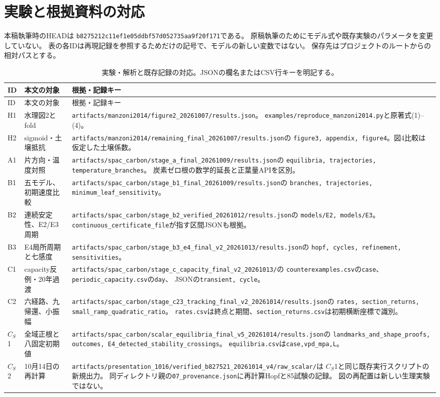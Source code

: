 \documentclass[a4paper,11pt]{ltjsarticle}
\newcommand{\code}[1]{\nolinkurl{#1}}
\begin{document}
\section{実験と根拠資料の対応}\label{app:evidence}
本稿執筆時のHEADは
\code{b8275212c11ef1e05ddbf57d052735aa9f20f171}である。
原稿執筆のためにモデル式や既存実験のパラメータを変更していない。
表の各IDは再現記録を参照するためだけの記号で、モデルの新しい変数ではない。
保存先はプロジェクトのルートからの相対パスとする。
\begin{longtable}{p{.09\linewidth}p{.22\linewidth}p{.60\linewidth}}
\caption{実験・解析と既存記録の対応。JSONの欄名またはCSV行キーを明記する。}\\
\toprule ID&本文の対象&根拠・記録キー\\\midrule\endfirsthead
\toprule ID&本文の対象&根拠・記録キー\\\midrule\endhead
H1&水理図2とfold&
\code{artifacts/manzoni2014/figure2_20261007/results.json}。
\code{examples/reproduce_manzoni2014.py}と原著式(1)--(4)。\\
H2&sigmoid・土壌抵抗&
\code{artifacts/manzoni2014/remaining_final_20261007/results.json}の
\code{figure3, appendix, figure4}。図4比較は仮定した土壌係数。\\
A1&片方向・温度対照&
\code{artifacts/spac_carbon/stage_a_final_20261009/results.json}の
\code{equilibria, trajectories, temperature_branches}。
炭素ゼロ根の数学的延長と正葉量APIを区別。\\
B1&五モデル、初期速度比較&
\code{artifacts/spac_carbon/stage_b1_final_20261009/results.json}の
\code{branches, trajectories, minimum_leaf_sensitivity}。\\
B2&連続安定性、E2/E3周期&
\code{artifacts/spac_carbon/stage_b2_verified_20261012/results.json}の
\code{models/E2, models/E3}。
\code{continuous_certificate_file}が指す区間JSONも根拠。\\
B3&E4局所周期と七感度&
\code{artifacts/spac_carbon/stage_b3_e4_final_v2_20261013/results.json}の
\code{hopf, cycles, refinement, sensitivities}。\\
C1&capacity反例・20年過渡&
\code{artifacts/spac_carbon/stage_c_capacity_final_v2_20261013/}の
\code{counterexamples.csv}の\code{case}、
\code{periodic_capacity.csv}の\code{day}、
JSONの\code{transient, cycle}。\\
C2&六経路、九帰還、小振幅&
\code{artifacts/spac_carbon/stage_c23_tracking_final_v2_20261014/results.json}の
\code{rates, section_returns, small_ramp_quadratic_ratio}。
\code{rates.csv}は終点と期間、\code{section_returns.csv}は初期横断座標で識別。\\
$C_S$1&全域正根と八固定初期値&
\code{artifacts/spac_carbon/scalar_equilibria_final_v5_20261014/results.json}の
\code{landmarks_and_shape_proofs, outcomes, E4_detected_stability_crossings}。
\code{equilibria.csv}は\code{case,vpd_mpa,L}。\\
$C_S$2&10月14日の再計算&
\code{artifacts/presentation_1016/verified_b827521_20261014_v4/raw_scalar/}は
$C_S$1と同じ既存実行スクリプトの新規出力。
同ディレクトリ親の\code{07_provenance.json}に再計算Hopfと85試験の記録。
図の再配置は新しい生理実験ではない。\\
\bottomrule
\end{longtable}
\end{document}
